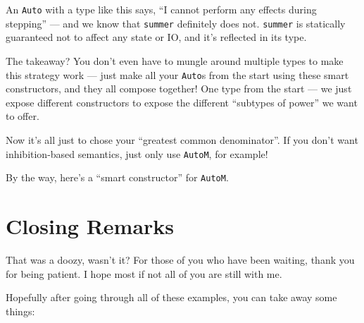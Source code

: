 \documentclass[]{article}
\newenvironment{Shaded}{}{}
\newcommand{\CommentTok}[1]{\textcolor[rgb]{0.38,0.63,0.69}{\textit{#1}}}
\newcommand{\DataTypeTok}[1]{\textcolor[rgb]{0.56,0.13,0.00}{#1}}
\newcommand{\FunctionTok}[1]{\textcolor[rgb]{0.02,0.16,0.49}{#1}}
\newcommand{\NormalTok}[1]{#1}
\newcommand{\OperatorTok}[1]{\textcolor[rgb]{0.40,0.40,0.40}{#1}}
\newcommand{\OtherTok}[1]{\textcolor[rgb]{0.00,0.44,0.13}{#1}}
\begin{document}
An \texttt{Auto} with a type like this says, ``I cannot perform any effects
during stepping'' --- and we know that \texttt{summer} definitely does not.
\texttt{summer} is statically guaranteed not to affect any state or IO, and it's
reflected in its type.

The takeaway? You don't even have to mungle around multiple types to make this
strategy work --- just make all your \texttt{Auto}s from the start using these
smart constructors, and they all compose together! One type from the start ---
we just expose different constructors to expose the different ``subtypes of
power'' we want to offer.

Now it's all just to chose your ``greatest common denominator''. If you don't
want inhibition-based semantics, just only use \texttt{AutoM}, for example!

By the way, here's a ``smart constructor'' for \texttt{AutoM}.

\begin{Shaded}
\end{Shaded}

\section{Closing Remarks}\label{closing-remarks}

That was a doozy, wasn't it? For those of you who have been waiting, thank you
for being patient. I hope most if not all of you are still with me.

Hopefully after going through all of these examples, you can take away some
things:
\end{document}
